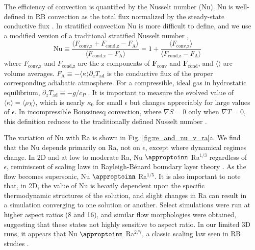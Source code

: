 \documentclass[aps, prl, twocolumn, nofootinbib, groupedaddress, amsfonts, amssymb, amsmath]{revtex4-1}
\newcommand{\grad}{\ensuremath{\nabla}}
\newcommand{\RB}{Rayleigh-B\'{e}nard }
\newcommand{\approptoinn}[2]{\mathrel{\vcenter{
	\offinterlineskip\halign{\hfil$##$\cr
	#1\propto\cr\noalign{\kern2pt}#1\sim\cr\noalign{\kern-2pt}}}}}
\newcommand{\appropto}{\mathpalette\approptoinn\relax}
\begin{document}
The efficiency of convection is quantified by the Nusselt number (Nu).  
Nu is well-defined in RB convection
as the total flux normalized by the steady-state conductive flux 
\cite{johnston&doering2009, otero&all2002}.
In stratified convection Nu is more difficult to define, and we use
a modified version of a traditional stratified Nusselt number 
\cite{graham1975,hurlburt&all1984},
\begin{equation}
\text{Nu} \equiv \frac{\langle F_{\text{conv,z}} + F_{\text{cond,z}} - F_{\text{A}}\rangle}
{\langle F_{\text{cond,z}} - F_{\text{A}}\rangle} 
= 1 + \frac{\langle F_{\text{conv,z}}\rangle}{\langle F_{\text{cond,z}} - F_{\text{A}} \rangle}
\label{eqn:nusselt}
\end{equation}
where $F_{\text{conv,z}}$ and $F_{\text{cond,z}}$ are the 
z-components of $\bm{F}_{\text{conv}}$ and $\bm{F}_{\text{cond}}$,
and $\langle \rangle$ are volume averages.  
$F_{\text{A}} \equiv -\langle\kappa\rangle \partial_z T_{\text{ad}}$ 
is the conductive flux of the proper corresponding adiabatic atmosphere.
For a compressible, ideal gas in hydrostatic equilibrium,
$\partial_z T_{\text{ad}} \equiv - g / c_{P}$ \cite{spiegel&veronis1960}.  
It is important to measure the evolved value of
$\langle \kappa \rangle = \langle \rho\chi \rangle$, which is nearly
$\kappa_0$ for small $\epsilon$ but changes appreciably for large
values of $\epsilon$.
In incompressible Boussinesq convection, where $\grad S = 0$ only when 
$\grad T = 0$, this definition reduces to the traditionally defined
Nusselt number \cite{otero&all2002, johnston&doering2009}.

The variation of Nu with Ra is shown in 
Fig. \ref{fig:re_and_nu_v_ra}a.  We find that the Nu depends primarily
on Ra, not on $\epsilon$, except where dynamical regimes change.
In 2D and at low to moderate Ra, 
Nu $\appropto$ Ra$^{1/3}$ regardless of $\epsilon$,
reminiscent of scaling laws in \RB boundary layer theory 
\cite{grossman&lohse2000, ahlers&all2009, king&all2012}.
As the flow becomes supersonic,  Nu $\appropto$ Ra$^{1/5}$.
It is also important to note that, in 2D,
the value of Nu is heavily dependent upon the specific thermodynamic
structures of the solution, and slight changes in
Ra can result in a simulation converging to one solution or another. 
Select simulations were run at higher aspect ratios (8 and 16), and similar flow
morphologies were obtained, suggesting that these states not highly
sensitive to aspect ratio.
In our limited 3D runs, it appears that Nu $\appropto$ Ra$^{2/7}$, a classic scaling law
seen in RB studies \cite{johnston&doering2009}.
\end{document}
